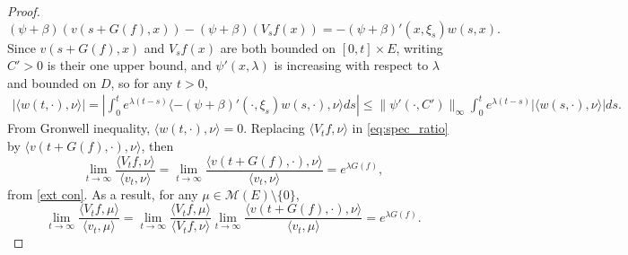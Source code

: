 \documentclass[12pt,a4paper]{amsart}
\numberwithin{equation}{section}
\theoremstyle{plain}
\theoremstyle{definition}
\begin{document}
\begin{proof}
  \[
    (\psi+\beta)(v(s+G(f),x))-(\psi+\beta)(V_sf(x))=-(\psi+\beta)'(x, \xi_s)w(s,x).
  \]
	Since $v(s+G(f),x)$ and $V_sf(x)$ are both bounded on $[0,t]\times E$, writing $C'>0$ is their one upper bound, and $\psi'(x, \lambda)$ is increasing with respect to $\lambda$ and bounded on $D$, so for any $t>0$,
  \begin{eqnarray*}
    |\langle w(t,\cdot),\nu\rangle |=|\int_0^te^{\lambda(t-s)}\langle -(\psi+\beta)'(\cdot, \xi_s)w(s,\cdot),\nu\rangle ds|\leq \|\psi'(\cdot,C')\|_\infty\int_0^te^{\lambda(t-s)}|\langle w(s,\cdot),\nu\rangle |ds.
  \end{eqnarray*}
	From Gronwell inequality, $\langle w(t,\cdot),\nu\rangle =0$.  Replacing $\langle V_tf,\nu\rangle $ in \eqref{eq:spec_ratio} by $\langle v(t+G(f),\cdot),\nu\rangle $, then
  \[
    \lim_{t\rightarrow\infty}\frac{\langle V_tf,\nu\rangle }{\langle v_t,\nu\rangle }=
    \lim_{t\rightarrow\infty}\frac{\langle v(t+G(f),\cdot),\nu\rangle }{\langle v_t,\nu\rangle }=e^{\lambda G(f)},
  \]
	from \eqref{ext con}.  As a result, for any $\mu\in\mathcal M(E)\setminus\{0\}$,
  \[
    \lim_{t\rightarrow\infty}\frac{\langle V_tf,\mu\rangle }{\langle v_t,\mu\rangle }
    =\lim_{t\rightarrow\infty}\frac{\langle V_tf,\mu\rangle }{\langle V_tf,\nu\rangle }
    \lim_{t\rightarrow\infty}\frac{\langle v(t+G(f),\cdot),\nu\rangle }{\langle v_t,\mu\rangle }=e^{\lambda G(f)}.
  \]
\end{proof}
\end{document}

